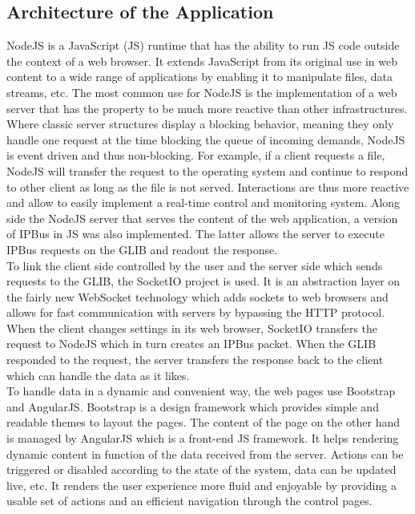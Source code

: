     \subsection{Architecture of the Application}

      NodeJS is a JavaScript (JS) runtime that has the ability to run JS code outside the context of a web browser. It extends JavaScript from its original use in web content to a wide range of applications by enabling it to manipulate files, data streams, etc. The most common use for NodeJS is the implementation of a web server that has the property to be much more reactive than other infrastructures. Where classic server structures display a blocking behavior, meaning they only handle one request at the time blocking the queue of incoming demands, NodeJS is event driven and thus non-blocking. For example, if a client requests a file, NodeJS will transfer the request to the operating system and continue to respond to other client as long as the file is not served. Interactions are thus more reactive and allow to easily implement a real-time control and monitoring system. Along side the NodeJS server that serves the content of the web application, a version of IPBus in JS was also implemented. The latter allows the server to execute IPBus requests on the GLIB and readout the response. \\

      To link the client side controlled by the user and the server side which sends requests to the GLIB, the SocketIO project is used. It is an abstraction layer on the fairly new WebSocket technology which adds sockets to web browsers and allows for fast communication with servers by bypassing the HTTP protocol. When the client changes settings in its web browser, SocketIO transfers the request to NodeJS which in turn creates an IPBus packet. When the GLIB responded to the request, the server transfers the response back to the client which can handle the data as it likes. \\

      To handle data in a dynamic and convenient way, the web pages use Bootstrap and AngularJS. Bootstrap is a design framework which provides simple and readable themes to layout the pages. The content of the page on the other hand is managed by AngularJS which is a front-end JS framework. It helps rendering dynamic content in function of the data received from the server. Actions can be triggered or disabled according to the state of the system, data can be updated live, etc. It renders the user experience more fluid and enjoyable by providing a usable set of actions and an efficient navigation through the control pages.


